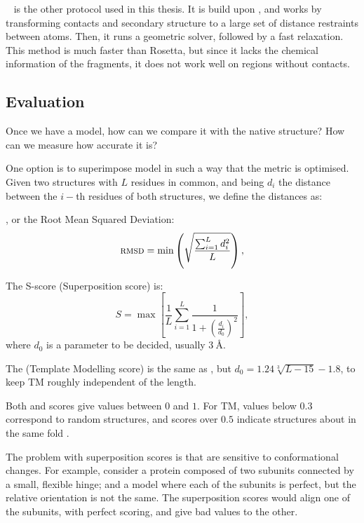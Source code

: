 \CONFOLD~\citep{confold}  is the other protocol used in this thesis.
It is build upon \CNS, and works by transforming contacts and secondary structure to a large set of distance restraints between atoms.
Then, it runs a geometric solver, followed by a fast relaxation.
This method is much faster than Rosetta, but since it lacks the chemical information of the fragments, it does not work well on regions without contacts.


\subsection{Evaluation}
Once we have a model, how can we compare it with the native structure? How can we measure how accurate it is?

One option is to superimpose model in such a way that the metric is optimised. 
Given two structures with $L$ residues in common, and being $d_i$ the distance between the $i-$th residues of both structures, we define the distances as:

\RMSD, or the Root Mean Squared Deviation:
\begin{equation*}
\textsc{rmsd} = \min \left(\sqrt{\frac{\sum_{i=1}^L d_i^2}{L}}\right),
\end{equation*}

The S-score (Superposition score) is:
\begin{equation*}
S = \max\left[\frac{1}{L} \sum_{i=1}^L \frac{1}{1 + \left(\frac{d_i}{d_0}\right)^2}\right],
\end{equation*}
where $d_0$ is a parameter to be decided, usually 3$\SI{}{\angstrom}$.

The \TM{} (Template Modelling score) is the same as \Ss, but $d_0 = 1.24 \sqrt[3]{L - 15} - 1.8$, to keep TM roughly independent of the length.

Both \Ss{} and \TM{} scores give values between $0$ and $1$.
For TM, values below $0.3$ correspond to random structures, and scores over $0.5$ indicate structures about in the same fold \citep{tmscore05}.

The problem with superposition scores is that are sensitive to conformational changes.
For example, consider a protein composed of two subunits connected by a small, flexible hinge; and a model where each of the subunits is perfect, but the relative orientation is not the same.
The superposition scores would align one of the subunits, with perfect scoring, and give bad values to the other.

